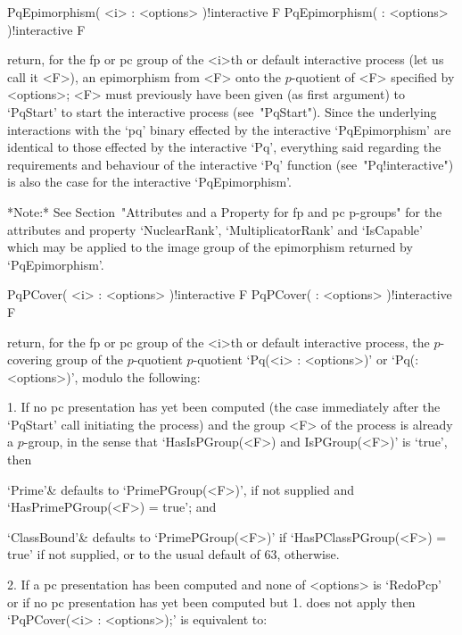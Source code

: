 \>PqEpimorphism( <i> : <options> )!{interactive} F
\>PqEpimorphism( : <options> )!{interactive} F

return, for the fp or pc  group  of  the  <i>th  or  default  interactive
{\ANUPQ} process (let us call it <F>), an epimorphism from <F>  onto  the
$p$-quotient of <F> specified by <options>; <F> must previously have been
given (as first argument) to `PqStart' to start the interactive  {\ANUPQ}
process (see~"PqStart"). Since the underlying interactions with the  `pq'
binary effected by the interactive `PqEpimorphism' are identical to those
effected  by  the  interactive  `Pq',  everything  said   regarding   the
requirements   and   behaviour   of   the   interactive   `Pq'   function
(see~"Pq!interactive")   is   also   the   case   for   the   interactive
`PqEpimorphism'.

*Note:*
See Section~"Attributes and a Property for fp and pc  p-groups"  for  the
attributes   and   property   `NuclearRank',   `MultiplicatorRank'    and
`IsCapable' which may be applied to the image group  of  the  epimorphism
returned by `PqEpimorphism'.

\>PqPCover( <i> : <options> )!{interactive} F
\>PqPCover( : <options> )!{interactive} F

return, for the fp or pc  group  of  the  <i>th  or  default  interactive
{\ANUPQ} process, the $p$-covering group of the $p$-quotient $p$-quotient
`Pq(<i> : <options>)' or `Pq(: <options>)', modulo the following:

\beginlist%

\item{1.}
If no pc presentation has yet been computed (the case  immediately  after
the `PqStart' call initiating the process)  and  the  group  <F>  of  the
process is already a $p$-group, in the sense that  `HasIsPGroup(<F>)  and
IsPGroup(<F>)' is `true', then

\endlist
\beginitems

`Prime'& 
defaults to `PrimePGroup(<F>)', if not supplied and  `HasPrimePGroup(<F>)
= true'; and

`ClassBound'&
defaults to `PrimePGroup(<F>)' if `HasPClassPGroup(<F>) =  true'  if  not
supplied, or to the usual default of 63, otherwise.

\enditems
\beginlist%

\item{2.}
If a pc presentation has been computed and none of <options> is `RedoPcp'
or if no pc presentation has yet been computed but 1. does not apply then
`PqPCover(<i> : <options>);' is equivalent to:


